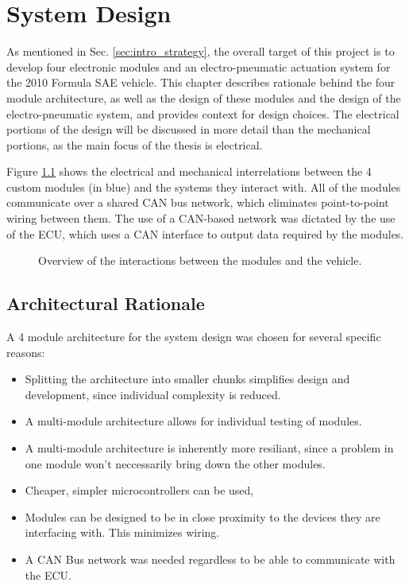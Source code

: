 \chapter{System Design\label{cha:design}}

As mentioned in Sec. \ref{sec:intro_strategy}, the overall target of this project is to develop four electronic modules and an electro-pneumatic actuation system for the 2010 Formula SAE vehicle. This chapter describes rationale behind the four module architecture, as well as the design of these modules and the design of the electro-pneumatic system, and provides context for design choices. The electrical portions of the design will be discussed in more detail than the mechanical portions, as the main focus of the thesis is electrical. 

Figure \ref{fig:design_overview} shows the electrical and mechanical interrelations between the 4 custom modules (in blue) and the systems they interact with. All of the modules communicate over a shared CAN bus network, which eliminates point-to-point wiring between them. The use of a CAN-based network was dictated by the use of the ECU, which uses a CAN interface to output data required by the modules. 

\begin{figure}[H]
\centering

\caption{Overview of the interactions between the modules and the vehicle.}
\label{fig:design_overview}
\end{figure}

\section{Architectural Rationale}

A 4 module architecture for the system design was chosen for several specific reasons:
\begin{itemize}
  \item Splitting the architecture into smaller chunks simplifies design and development, since individual complexity is reduced.
  \item A multi-module architecture allows for individual testing of modules.
  \item A multi-module architecture is inherently more resiliant, since a problem in one module won't neccessarily bring down the other modules.
  \item Cheaper, simpler microcontrollers can be used,
  \item Modules can be designed to be in close proximity to the devices they are interfacing with. This minimizes wiring.
  \item A CAN Bus network was needed regardless to be able to communicate with the ECU.
\end{itemize}





